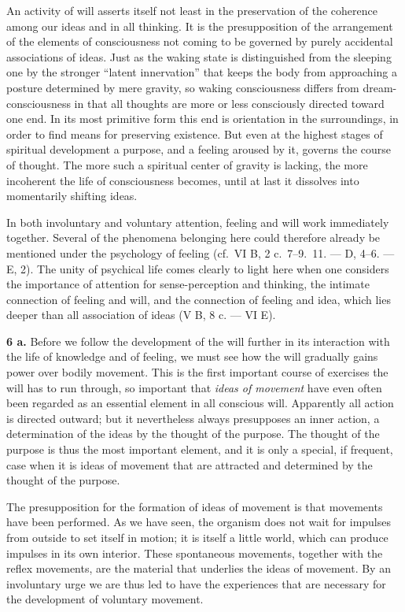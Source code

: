 \documentclass[12pt,a4paper]{book}
\newcommand{\opage}[1]{\marginnote{\footnotesize\textit{[#1]}}}
\begin{document}
An activity of will asserts itself not least in the preservation of the
coherence among our ideas and in all thinking. It is the presupposition
of the arrangement of the elements of consciousness not coming to be
governed by purely accidental associations of ideas. Just as the waking
state is distinguished from the sleeping one by the stronger ``latent
innervation'' that keeps the body from approaching a posture determined
by mere gravity, so waking consciousness differs from dream-consciousness
in that all thoughts are more or less consciously directed toward one
end. In its most primitive form this end is orientation in the
surroundings, in order to find means for preserving existence. But even
at the highest stages of spiritual development a purpose, and a feeling
aroused by it, governs the course of thought. The more such a spiritual
center of gravity is lacking, the more incoherent the life of
consciousness becomes, until at last it dissolves into momentarily
shifting ideas.

In both involuntary and voluntary attention, feeling and will work
immediately together. Several of the phenomena belonging here could
therefore already be mentioned under the psychology of feeling (cf.\ VI
B, 2 c.\ 7--9.\ 11. --- D, 4--6. --- E, 2). The unity of psychical life
comes clearly to light here when one considers the importance of
attention for
\opage{375}sense-perception and thinking, the intimate connection of
feeling and will, and the connection of feeling and idea, which lies
deeper than all association of ideas (V B, 8 c. --- VI E).

\textbf{6 a.} Before we follow the development of the will further in its
interaction with the life of knowledge and of feeling, we must see how
the will gradually gains power over bodily movement. This is the first
important course of exercises the will has to run through, so important
that \emph{ideas of movement} have even often been regarded as an
essential element in all conscious will. Apparently all action is
directed outward; but it nevertheless always presupposes an inner action,
a determination of the ideas by the thought of the purpose. The thought
of the purpose is thus the most important element, and it is only a
special, if frequent, case when it is ideas of movement that are
attracted and determined by the thought of the purpose.

The presupposition for the formation of ideas of movement is that
movements have been performed. As we have seen, the organism does not
wait for impulses from outside to set itself in motion; it is itself a
little world, which can produce impulses in its own interior. These
spontaneous movements, together with the reflex movements, are the
material that underlies the ideas of movement. By an involuntary urge we
are thus led to have the experiences that are necessary for the
development of voluntary movement.
\end{document}
